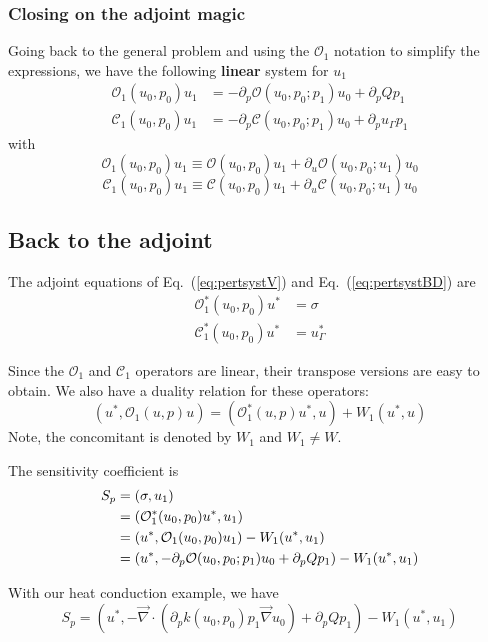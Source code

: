 \documentclass[11pt]{article}
\renewcommand{\div}{\vec{\nabla}\! \cdot \!}
\newcommand{\grad}{\vec{\nabla}}
\newcommand{\eqt}[1]{Eq.~(\ref{#1})}                     %
\newcommand{\be}{\begin{equation}}
\newcommand{\ee}{\end{equation}}
\renewcommand{\O}{\mathcal{O}}
\newcommand{\mc}[1]{\mathcal{#1}}
\newcommand{\us}{{u^\ast}}
\begin{document}
\subsubsection{Closing on the adjoint magic}

Going back to the general problem and using the $\O_1$ notation to simplify the 
expressions, we have the following {\bf linear} system for $u_1$
\begin{align}
\O_1(u_0,p_0) u_1 &= -\partial_p \O(u_0,p_0;p_1) u_0 +\partial_p Q p_1 \label{eq:pertsystV}\\
\mc{C}_1(u_0,p_0) u_1 &= -\partial_p \mc{C}(u_0,p_0;p_1) u_0 +\partial_p u_\Gamma p_1 \label{eq:pertsystBD}
\end{align}
with
\be
\O_1(u_0,p_0) u_1 \equiv \O(u_0,p_0) u_1 + \partial_u \O(u_0,p_0;u_1)  u_0
\ee
\be
\mc{C}_1(u_0,p_0) u_1 \equiv \mc{C}(u_0,p_0) u_1 + \partial_u \mc{C}(u_0,p_0;u_1)  u_0
\ee

\subsection{Back to the adjoint}

The adjoint equations of \eqt{eq:pertsystV} and \eqt{eq:pertsystBD}  are
%
\begin{align}
\O_1^\ast(u_0,p_0) u^\ast     &= \sigma  \label{eq:adjV} \\ %
\mc{C}^\ast_1(u_0,p_0) u^\ast &= u^\ast_\Gamma \label{eq:adjBD} 
\end{align}

Since the $\O_1$ and $\mc{C}_1$ operators are linear, their transpose versions are easy to obtain. 
We also have a duality relation for these operators:
\be
(\us,\O_1(u,p)u) = (\O_1^\ast(u,p)\us,u) + W_1(\us,u)
\ee
Note, the concomitant is denoted by $W_1$ and $W_1 \ne W$.

The sensitivity coefficient is 
%
\begin{align}
S_p &= (\sigma, u_1) \notag \\
&= (\O_1^\ast(u_0,p_0) \us, u_1)  \notag \\
&= ( \us, \O_1(u_0,p_0) u_1) -W_1(\us,u_1) \notag \\
&= ( \us, -\partial_p \O(u_0,p_0;p_1) u_0 +\partial_p Q p_1) -W_1(\us,u_1) 
\end{align}

With our heat conduction example, we have
\be
S_p = \left( \us,  -\div \left( \partial_p k(u_0,p_0) p_1\grad u_0 \right) +\partial_p Q p_1 \right) -W_1(\us,u_1) 
\label{eq:dotprod}
\ee
\end{document}
